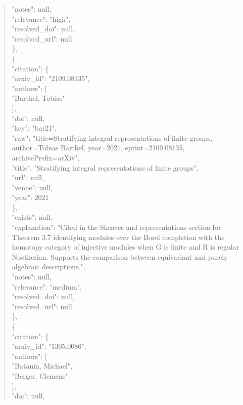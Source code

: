 \documentclass[11pt]{article}
\begin{document}
\begin{quote}
      "notes": null,\\
      "relevance": "high",\\
      "resolved\_doi": null,\\
      "resolved\_url": null\\
    \},\\
    \{\\
      "citation": \{\\
        "arxiv\_id": "2109.08135",\\
        "authors": [\\
          "Barthel, Tobias"\\
        ],\\
        "doi": null,\\
        "key": "bar21",\\
        "raw": "title=Stratifying integral representations of finite groups, author=Tobias Barthel, year=2021, eprint=2109.08135, archivePrefix=arXiv",\\
        "title": "Stratifying integral representations of finite groups",\\
        "url": null,\\
        "venue": null,\\
        "year": 2021\\
      \},\\
      "exists": null,\\
      "explanation": "Cited in the Sheaves and representations section for Theorem 3.7 identifying modules over the Borel completion with the homotopy category of injective modules when G is finite and R is regular Noetherian. Supports the comparison between equivariant and purely algebraic descriptions.",\\
      "notes": null,\\
      "relevance": "medium",\\
      "resolved\_doi": null,\\
      "resolved\_url": null\\
    \},\\
    \{\\
      "citation": \{\\
        "arxiv\_id": "1305.0086",\\
        "authors": [\\
          "Batanin, Michael",\\
          "Berger, Clemens"\\
        ],\\
        "doi": null,\\

\end{quote}
\end{document}
